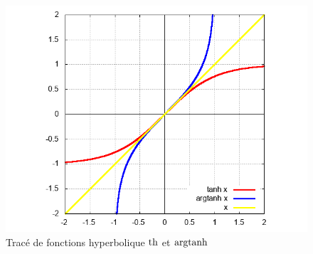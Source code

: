 %
\begin{figure}
  \centering
  \includegraphics[scale=0.4,angle=-90]{argtanh.png}
  \caption{Tracé de fonctions hyperbolique $\operatorname{th}$ et $\operatorname{argtanh}$}
  \label{fig:tracetanhargth}
\end{figure}
